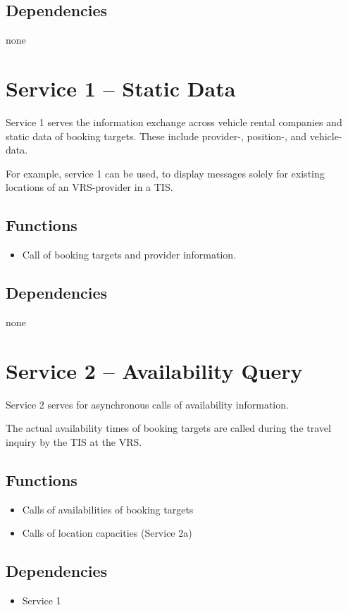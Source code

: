 \subsection*{Dependencies}
none


\section{Service 1 -- Static Data}
\label{sec:Hierachiemodell:Dienst1}
Service 1 serves the information exchange across vehicle rental companies and static data of booking targets. These include provider-, position-, and vehicle-data. 

For example, service 1 can be used, to display messages solely for existing locations of an VRS-provider in a TIS. 
\subsection*{Functions}
\begin{itemize}
\item Call of booking targets and provider information.
\end{itemize}

\subsection*{Dependencies}
none

\section{Service 2 -- Availability Query}
\label{sec:Hierachiemodell:Dienst2}
Service 2 serves for asynchronous calls of availability information.

The actual availability times of booking targets are called during the travel inquiry by the TIS at the VRS.
\subsection*{Functions}
\begin{itemize}
\item Calls of availabilities of booking targets
\item Calls of location capacities (Service 2a)
\end{itemize}

\subsection*{Dependencies}
\begin{itemize}
\item Service 1
\end{itemize}

